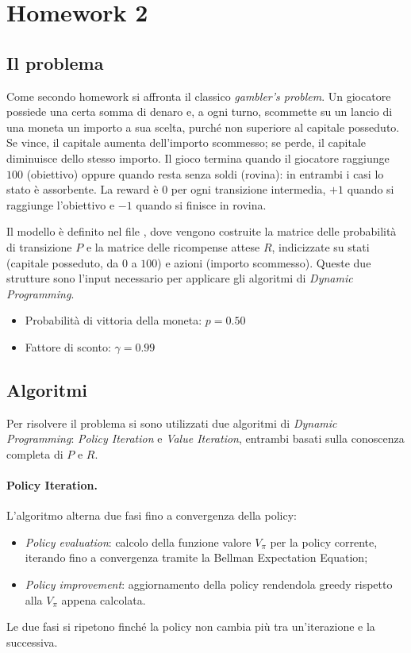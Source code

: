 \section{Homework 2}

\subsection{Il problema}
Come secondo homework si affronta il classico \textit{gambler's problem}. Un giocatore possiede una certa somma di denaro e, a ogni turno, scommette su un lancio di una moneta un importo a sua scelta, purché non superiore al capitale posseduto. Se vince, il capitale aumenta dell'importo scommesso; se perde, il capitale diminuisce dello stesso importo. Il gioco termina quando il giocatore raggiunge $100$ (obiettivo) oppure quando resta senza soldi (rovina): in entrambi i casi lo stato è assorbente. La reward è $0$ per ogni transizione intermedia, $+1$ quando si raggiunge l'obiettivo e $-1$ quando si finisce in rovina.

Il modello è definito nel file , dove vengono costruite la matrice delle probabilità di transizione $P$ e la matrice delle ricompense attese $R$, indicizzate su stati (capitale posseduto, da $0$ a $100$) e azioni (importo scommesso). Queste due strutture sono l'input necessario per applicare gli algoritmi di \textit{Dynamic Programming}.

\begin{infobox}[Parametri]
\begin{itemize}[nosep]
    \item Probabilità di vittoria della moneta: $p = 0.50$ 
    \item Fattore di sconto: $\gamma = 0.99$ 
\end{itemize}
\end{infobox}

\subsection{Algoritmi}
Per risolvere il problema si sono utilizzati due algoritmi di \textit{Dynamic Programming}: \textit{Policy Iteration} e \textit{Value Iteration}, entrambi basati sulla conoscenza completa di $P$ e $R$.

\paragraph{Policy Iteration.} L'algoritmo alterna due fasi fino a convergenza della policy:
\begin{itemize}[nosep]
    \item \emph{Policy evaluation}: calcolo della funzione valore $V_\pi$ per la policy corrente, iterando fino a convergenza tramite la Bellman Expectation Equation;
    \item \emph{Policy improvement}: aggiornamento della policy rendendola greedy rispetto alla $V_\pi$ appena calcolata.
\end{itemize}
Le due fasi si ripetono finché la policy non cambia più tra un'iterazione e la successiva.

